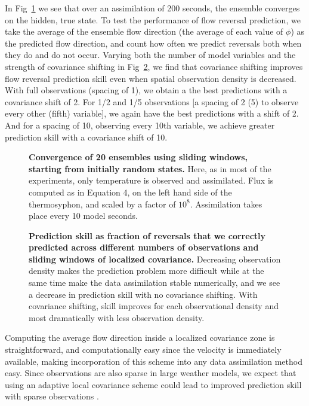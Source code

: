 \documentclass[10pt,letterpaper]{article}
\begin{document}
In Fig~\ref{fig:sliding_spag} we see that over an assimilation of 200 seconds, the ensemble converges on the hidden, true state.
To test the performance of flow reversal prediction, we take the average of the ensemble flow direction (the average of each value of $\phi$) as the predicted flow direction, and count how often we predict reversals both when they do and do not occur.
Varying both the number of model variables and the strength of covariance shifting in Fig~\ref{fig:sliding_results}, we find that covariance shifting improves flow reversal prediction skill even when spatial observation density is decreased.
With full observations (spacing of 1), we obtain a the best predictions with a covariance shift of 2.
For 1/2 and 1/5 observations [a spacing of 2 (5) to observe every other (fifth) variable], we again have the best predictions with a shift of 2.
And for a spacing of 10, observing every 10th variable, we achieve greater prediction skill with a covariance shift of 10.

\begin{figure}[h]
  \centering
  \caption[]{
\textbf{    Convergence of 20 ensembles using sliding windows, starting from initially random states.
}    Here, as in most of the experiments, only temperature is observed and assimilated.
    Flux is computed as in Equation 4, on the left hand side of the thermosyphon, and scaled by a factor of $10^8$.
    Assimilation takes place every 10 model seconds.
  }
  \label{fig:sliding_spag}
\end{figure}

\begin{figure}[h]
  \centering
  \caption[]{
\textbf{    Prediction skill as fraction of reversals that we correctly predicted across different numbers of observations and sliding windows of localized covariance.
}    Decreasing observation density makes the prediction problem more difficult while at the same time make the data assimilation stable numerically, and we see a decrease in prediction skill with no covariance shifting.
    With covariance shifting, skill improves for each observational density and most dramatically with less observation density.
  }
  \label{fig:sliding_results}
\end{figure}

Computing the average flow direction inside a localized covariance zone is straightforward, and computationally easy since the velocity is immediately available, making incorporation of this scheme into any data assimilation method easy.
Since observations are also sparse in large weather models, we expect that using an adaptive local covariance scheme could lead to improved prediction skill with sparse observations \cite{bishop2011a}.
\end{document}
